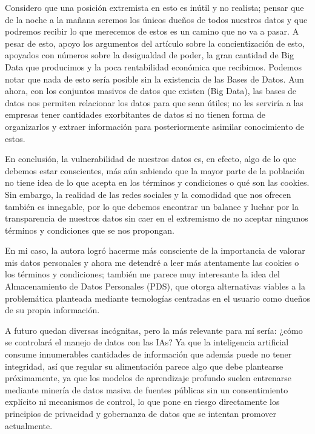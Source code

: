 Considero que una posición extremista en esto es inútil y no realista; pensar que de la noche a la mañana seremos los únicos dueños de todos nuestros datos y que podremos recibir lo que merecemos de estos es un camino que no va a pasar. A pesar de esto, apoyo los argumentos del artículo \cite{becerril2018value} sobre la concientización de esto, apoyados con números sobre la desigualdad de poder, la gran cantidad de Big Data que producimos y la poca rentabilidad económica que recibimos. Podemos notar que nada de esto sería posible sin la existencia de las Bases de Datos. Aun ahora, con los conjuntos masivos de datos que existen (Big Data), las bases de datos nos permiten relacionar los datos para que sean útiles; no les serviría a las empresas tener cantidades exorbitantes de datos si no tienen forma de organizarlos y extraer información para posteriormente asimilar conocimiento de estos.

En conclusión, la vulnerabilidad de nuestros datos es, en efecto, algo de lo que debemos estar conscientes, más aún sabiendo que la mayor parte de la población no tiene idea de lo que acepta en los términos y condiciones o qué son las cookies. Sin embargo, la realidad de las redes sociales y la comodidad que nos ofrecen también es innegable, por lo que debemos encontrar un balance y luchar por la transparencia de nuestros datos sin caer en el extremismo de no aceptar ningunos términos y condiciones que se nos propongan. 

En mi caso, la autora logró hacerme más consciente de la importancia de valorar mis datos personales y ahora me detendré a leer más atentamente las cookies o los términos y condiciones; también me parece muy interesante la idea del Almacenamiento de Datos Personales (PDS), que otorga alternativas viables a la problemática planteada mediante tecnologías centradas en el usuario como dueños de su propia información.

A futuro quedan diversas incógnitas, pero la más relevante para mí sería: ¿cómo se controlará el manejo de datos con las IAs? Ya que la inteligencia artificial consume innumerables cantidades de información que además puede no tener integridad, así que regular su alimentación parece algo que debe plantearse próximamente, ya que los modelos de aprendizaje profundo suelen entrenarse mediante minería de datos masiva de fuentes públicas sin un consentimiento explícito ni mecanismos de control, lo que pone en riesgo directamente los principios de privacidad y gobernanza de datos que se intentan promover actualmente.
